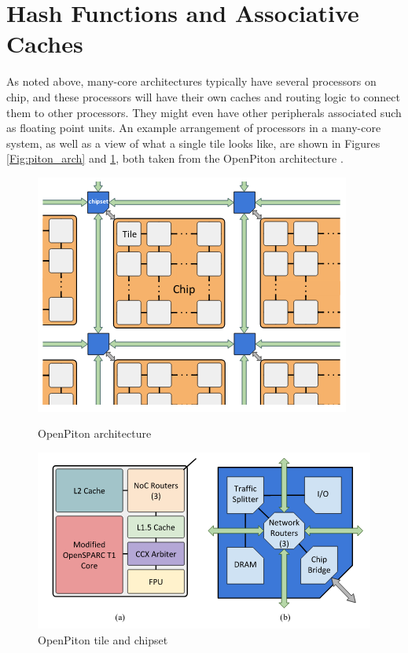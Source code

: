 \section{Hash Functions and Associative Caches}
\label{sec:Problem}

As noted above, many-core architectures typically have several processors on
chip, and these processors will have their own caches and routing logic to
connect them to other processors.  They might even have other peripherals
associated such as floating point units.  An example arrangement of processors
in a many-core system, as well as a view of what a single tile looks like, are
shown in Figures \ref{Fig:piton_arch} and \ref{Fig:piton_tile}, both taken from
the OpenPiton architecture \cite{openpiton}.

\begin{figure}[h]
  \centering
  \begin{minipage}[b]{0.4\textwidth}
    \includegraphics[width=\textwidth]{piton_arch.png}
    \caption{OpenPiton architecture}
    \label{Fig:piton_arch}
  \end{minipage}
  \hfill
  \begin{minipage}[b]{0.4\textwidth}
    \includegraphics[width=\textwidth]{piton_tile_and_chipset.png}
    \caption{OpenPiton tile and chipset}
    \label{Fig:piton_tile}
  \end{minipage}
\end{figure}


